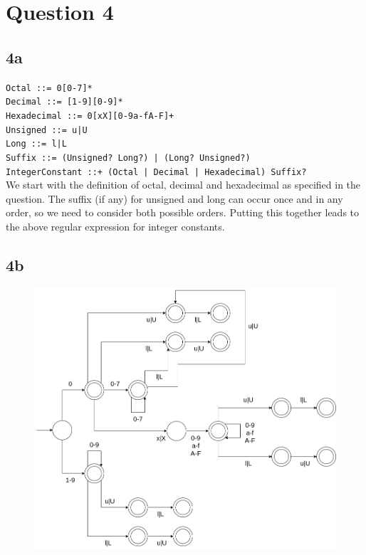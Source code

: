 \documentclass{article}
\begin{document}
    \section*{Question 4}
    
    \subsection*{4a}
    \verb!Octal ::= 0[0-7]*! \\
    \verb!Decimal ::= [1-9][0-9]*! \\
    \verb!Hexadecimal ::= 0[xX][0-9a-fA-F]+! \\
    \verb!Unsigned ::= u|U! \\
    \verb!Long ::= l|L! \\
    \verb!Suffix ::= (Unsigned? Long?) | (Long? Unsigned?)! \\
    \verb!IntegerConstant ::+ (Octal | Decimal | Hexadecimal) Suffix?! \\

    We start with the definition of octal, decimal and hexadecimal as specified in the question. The suffix (if any) for unsigned and long can occur once and in any order, so we need to consider both possible orders. Putting this together leads to the above regular expression for integer constants.

    \subsection*{4b}
    \begin{figure}[H]
        \includegraphics[width=1\textwidth]{hw1-dfa4b.png}
    \end{figure}
\end{document}
